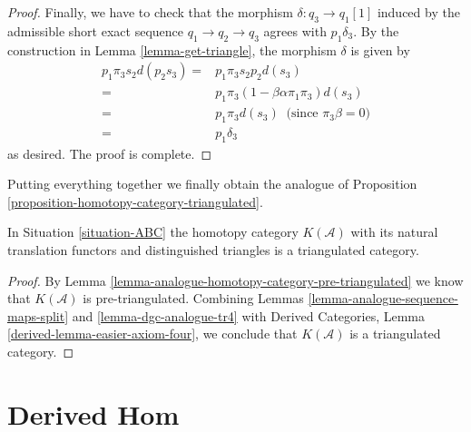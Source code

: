 \begin{proof}
\medskip\noindent
Finally, we have to check that the morphism
$\delta : q_3 \to q_1[1]$ induced by the admissible
short exact sequence $q_1\to q_2\to q_3$ agrees with
$p_1\delta_3$. By the construction in
Lemma \ref{lemma-get-triangle}, the morphism $\delta$ is given by
\begin{align*}
p_1\pi_3s_2d(p_2s_3)
= &
p_1\pi_3s_2p_2d(s_3) \\
= &
p_1\pi_3(1-\beta\alpha\pi_1\pi_3)d(s_3) \\
= &
p_1\pi_3d(s_3)\;\;\text{(since $\pi_3\beta=0$)} \\
= &
p_1\delta_3
\end{align*}
as desired. The proof is complete.
\end{proof}

\noindent
Putting everything together we finally obtain the analogue
of Proposition \ref{proposition-homotopy-category-triangulated}.

\begin{proposition}
\label{proposition-ABC-homotopy-category-triangulated}
In Situation \ref{situation-ABC} the homotopy category $K(\mathcal{A})$
with its natural translation functors and distinguished triangles is a
triangulated category.
\end{proposition}

\begin{proof}
By Lemma \ref{lemma-analogue-homotopy-category-pre-triangulated} we know that
$K(\mathcal{A})$ is pre-triangulated. Combining
Lemmas \ref{lemma-analogue-sequence-maps-split} and
\ref{lemma-dgc-analogue-tr4} with
Derived Categories, Lemma \ref{derived-lemma-easier-axiom-four},
we conclude that $K(\mathcal{A})$ is a triangulated category.
\end{proof}








\section{Derived Hom}
\label{section-restriction}

